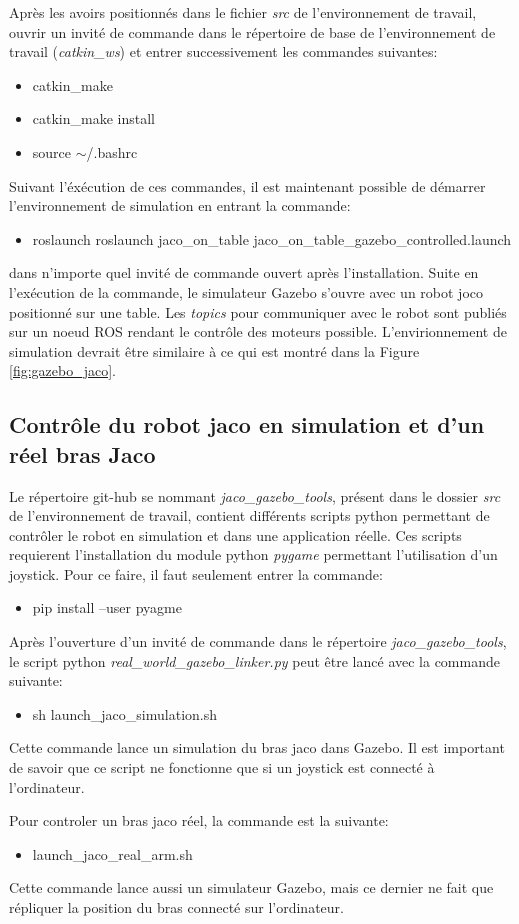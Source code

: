 \documentclass[root.tex]{subfiles}
\begin{document}
Après les avoirs positionnés dans le fichier \textit{src} de l'environnement de travail, ouvrir un invité de commande dans le répertoire de base de l'environnement de travail (\textit{catkin\_ws}) et entrer successivement les commandes suivantes:

\begin{itemize}
\item catkin\_make
\item catkin\_make install
\item source $\sim$/.bashrc
\end{itemize}

Suivant l'éxécution de ces commandes, il est maintenant possible de démarrer l'environnement de simulation en entrant la commande:
\begin{itemize}
\item roslaunch roslaunch jaco\_on\_table jaco\_on\_table\_gazebo\_controlled.launch
\end{itemize}
dans n'importe quel invité de commande ouvert après l'installation. 
Suite en l'exécution de la commande, le simulateur Gazebo s'ouvre avec un robot joco positionné sur une table.
Les \textit{topics} pour communiquer avec le robot sont publiés sur un noeud ROS rendant le contrôle des moteurs possible.
L'envirionnement de simulation devrait être similaire à ce qui est montré dans la Figure \ref{fig:gazebo_jaco}.

\subsection{Contrôle du robot jaco en simulation et d'un réel bras Jaco}

Le répertoire git-hub se nommant \textit{jaco\_gazebo\_tools}, présent dans le dossier \textit{src} de l'environnement de travail, contient différents scripts python permettant de contrôler le robot en simulation et dans une application réelle.
Ces scripts requierent l'installation du module python \textit{pygame} permettant l'utilisation d'un joystick.
Pour ce faire, il faut seulement entrer la commande:
\begin{itemize}
\item pip install --user pyagme
\end{itemize}
Après l'ouverture d'un invité de commande dans le répertoire \textit{jaco\_gazebo\_tools}, le script python \textit{real\_world\_gazebo\_linker.py} peut être lancé avec la commande suivante:
\begin{itemize}
\item sh launch_jaco_simulation.sh
\end{itemize}
Cette commande lance un simulation du bras jaco dans Gazebo.
Il est important de savoir que ce script ne fonctionne que si un joystick est connecté à l'ordinateur.

Pour controler un bras jaco réel, la commande est la suivante:

\begin{itemize}
\item launch_jaco_real_arm.sh
\end{itemize}

Cette commande lance aussi un simulateur Gazebo, mais ce dernier ne fait que répliquer la position du bras connecté sur l'ordinateur.


\newpage
\end{document}
